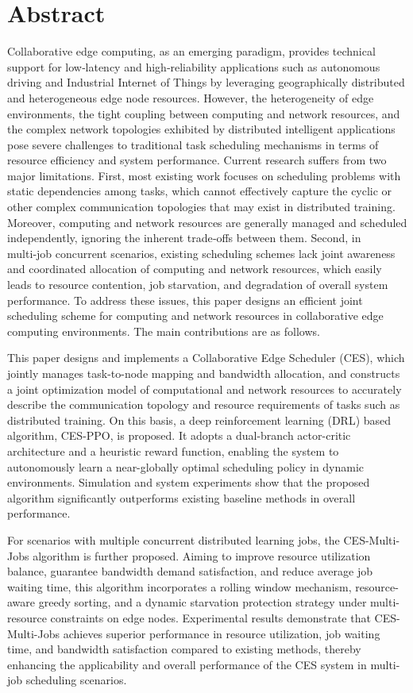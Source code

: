\chapter{Abstract}
Collaborative edge computing, as an emerging paradigm, provides technical support for low‑latency and high‑reliability applications such as autonomous driving and Industrial Internet of Things by leveraging geographically distributed and heterogeneous edge node resources. However, the heterogeneity of edge environments, the tight coupling between computing and network resources, and the complex network topologies exhibited by distributed intelligent applications pose severe challenges to traditional task scheduling mechanisms in terms of resource efficiency and system performance. Current research suffers from two major limitations. First, most existing work focuses on scheduling problems with static dependencies among tasks, which cannot effectively capture the cyclic or other complex communication topologies that may exist in distributed training. Moreover, computing and network resources are generally managed and scheduled independently, ignoring the inherent trade‑offs between them. Second, in multi‑job concurrent scenarios, existing scheduling schemes lack joint awareness and coordinated allocation of computing and network resources, which easily leads to resource contention, job starvation, and degradation of overall system performance. To address these issues, this paper designs an efficient joint scheduling scheme for computing and network resources in collaborative edge computing environments. The main contributions are as follows.

This paper designs and implements a Collaborative Edge Scheduler (CES), which jointly manages task-to-node mapping and bandwidth allocation, and constructs a joint optimization model of computational and network resources to accurately describe the communication topology and resource requirements of tasks such as distributed training. On this basis, a deep reinforcement learning (DRL) based algorithm, CES-PPO, is proposed. It adopts a dual-branch actor-critic architecture and a heuristic reward function, enabling the system to autonomously learn a near-globally optimal scheduling policy in dynamic environments. Simulation and system experiments show that the proposed algorithm significantly outperforms existing baseline methods in overall performance.

For scenarios with multiple concurrent distributed learning jobs, the CES-Multi-Jobs algorithm is further proposed. Aiming to improve resource utilization balance, guarantee bandwidth demand satisfaction, and reduce average job waiting time, this algorithm incorporates a rolling window mechanism, resource-aware greedy sorting, and a dynamic starvation protection strategy under multi-resource constraints on edge nodes. Experimental results demonstrate that CES-Multi-Jobs achieves superior performance in resource utilization, job waiting time, and bandwidth satisfaction compared to existing methods, thereby enhancing the applicability and overall performance of the CES system in multi-job scheduling scenarios.

